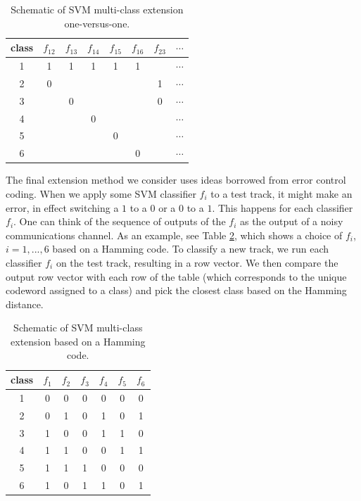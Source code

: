 \documentclass[12pt]{article}
\begin{document}
\begin{table}
   \centering
   \begin{tabular}{|c|ccccccc|}
      \hline
      class&$f_{12}$ & $f_{13}$ & $f_{14}$ & $f_{15}$ & $f_{16}$ & $f_{23}$ & $\cdots$ \\\hline
      1 & 1 & 1 & 1 & 1 & 1 &   & $\cdots$ \\\hline
      2 & 0 &   &   &   &   & 1 & $\cdots$ \\\hline
      3 &   & 0 &   &   &   & 0 & $\cdots$ \\\hline
      4 &   &   & 0 &   &   &   & $\cdots$ \\\hline
      5 &   &   &   & 0 &   &   & $\cdots$ \\\hline
      6 &   &   &   &   & 0 &   & $\cdots$ \\\hline
   \end{tabular}
   \caption{Schematic of SVM multi-class extension one-versus-one.}
   \label{tab:onevone}
\end{table}

The final extension method we consider uses ideas borrowed from error control coding.  When we apply some SVM classifier $f_i$ to a test track, it might make an error, in effect switching a $1$ to a $0$ or a $0$ to a $1$.  This happens for each classifier $f_i$.  One can think of the sequence of outputs of the $f_i$ as the output of a noisy communications channel.  As an example, see Table \ref{tab:ecoc}, which shows a choice of $f_i$, $i=1,...,6$ based on a Hamming code.  To classify a new track, we run each classifier $f_i$ on the test track, resulting in a row vector.  We then compare the output row vector with each row of the table (which corresponds to the unique codeword assigned to a class) and pick the closest class based on the Hamming distance.\\

\begin{table}
   \centering
   \begin{tabular}{|c|cccccc|}
      \hline
      class&$f_{1}$ & $f_{2}$ & $f_{3}$ & $f_{4}$ & $f_{5}$ & $f_{6}$ \\\hline
      1 & 0 & 0 & 0 & 0 & 0 & 0 \\\hline
      2 & 0 & 1 & 0 & 1 & 0 & 1 \\\hline
      3 & 1 & 0 & 0 & 1 & 1 & 0 \\\hline
      4 & 1 & 1 & 0 & 0 & 1 & 1 \\\hline
      5 & 1 & 1 & 1 & 0 & 0 & 0 \\\hline
      6 & 1 & 0 & 1 & 1 & 0 & 1 \\\hline
   \end{tabular}
   \caption{Schematic of SVM multi-class extension based on a Hamming code.}
   \label{tab:ecoc}
\end{table}
\end{document}
